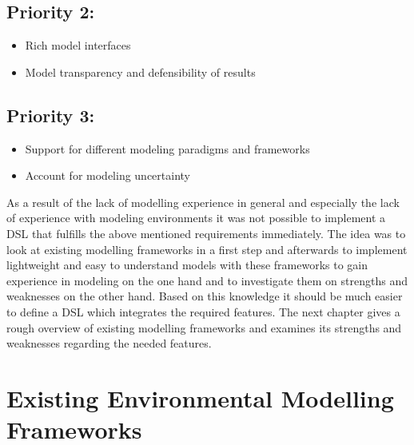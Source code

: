 \subsection*{Priority 2:}
\begin{itemize}
	\item  Rich model interfaces
	\item  Model transparency and defensibility of results
\end{itemize}
\subsection*{Priority 3:}
\begin{itemize}
	\item Support for different modeling paradigms and frameworks
	\item Account for modeling uncertainty
\end{itemize}
\par
As a result of the lack of  modelling experience in general and especially the lack of experience with modeling environments it was not possible to implement a DSL that fulfills the above mentioned requirements immediately. The idea was to look at existing modelling frameworks in a first step and afterwards to implement lightweight and easy to understand models with these frameworks to gain experience in modeling on the one hand and to investigate them on strengths and weaknesses on the other hand. Based on this knowledge it should be much easier to define a DSL which integrates the required features. The next chapter gives a rough overview of existing modelling frameworks and examines its strengths and weaknesses regarding the needed features.

\section{Existing Environmental Modelling Frameworks}













